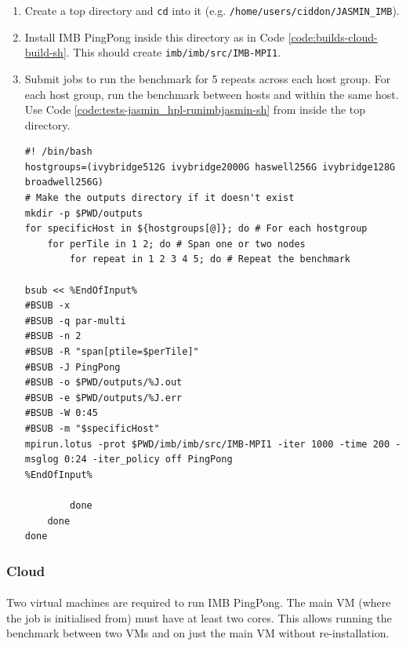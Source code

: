 \documentclass{article}
\newenvironment{code}{\captionsetup{type=listing}}{}
\begin{document}
            \begin{enumerate}
                \item Create a top directory and \verb|cd| into it (e.g. \verb|/home/users/ciddon/JASMIN_IMB|).
                \item Install IMB PingPong inside this directory as in Code \ref{code:builds-cloud-build-sh}. This should create \verb|imb/imb/src/IMB-MPI1|.
                \item Submit jobs to run the benchmark for 5 repeats across each host group. For each host group, run the benchmark between hosts and within the same host. Use Code \ref{code:tests-jasmin_hpl-runimbjasmin-sh} from inside the top directory.

                    \begin{code}
                    \label{code:tests-jasmin_hpl-runimbjasmin-sh}
                    \begin{verbatim}
#! /bin/bash
hostgroups=(ivybridge512G ivybridge2000G haswell256G ivybridge128G broadwell256G)
# Make the outputs directory if it doesn't exist
mkdir -p $PWD/outputs
for specificHost in ${hostgroups[@]}; do # For each hostgroup
    for perTile in 1 2; do # Span one or two nodes
        for repeat in 1 2 3 4 5; do # Repeat the benchmark

bsub << %EndOfInput%
#BSUB -x
#BSUB -q par-multi
#BSUB -n 2
#BSUB -R "span[ptile=$perTile]"
#BSUB -J PingPong
#BSUB -o $PWD/outputs/%J.out
#BSUB -e $PWD/outputs/%J.err
#BSUB -W 0:45
#BSUB -m "$specificHost"
mpirun.lotus -prot $PWD/imb/imb/src/IMB-MPI1 -iter 1000 -time 200 -msglog 0:24 -iter_policy off PingPong
%EndOfInput%

        done
    done
done
                    \end{verbatim}
                    \end{code}
            \end{enumerate}
        \subsubsection{Cloud}

            \paragraph{}
            Two virtual machines are required to run IMB PingPong. The main VM (where the job is initialised from) must have at least two cores. This allows running the benchmark between two VMs and on just the main VM without re-installation.
\end{document}
